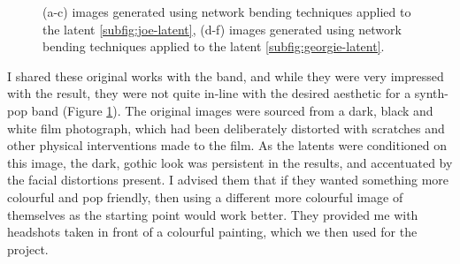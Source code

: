 \begin{figure}[!htbp]
    \hfill
    \hfill
    \hfill
    \caption{(a-c) images generated using network bending techniques applied to the latent \ref{subfig:joe-latent}, (d-f) images generated using network bending techniques applied to the latent \ref{subfig:georgie-latent}.}
    \label{fig:c7:0171-haunted}
 \end{figure}

I shared these original works with the band, and while they were very impressed with the result, they were not quite in-line with the desired aesthetic for a synth-pop band (Figure \ref{fig:c7:0171-haunted}). 
The original images were sourced from a dark, black and white film photograph, which had been deliberately distorted with scratches and other physical interventions made to the film. 
As the latents were conditioned on this image, the dark, gothic look was persistent in the results, and accentuated by the facial distortions present. 
I advised them that if they wanted something more colourful and pop friendly, then using a different more colourful image of themselves as the starting point would work better.
They provided me with headshots taken in front of a colourful painting, which we then used for the project. 

